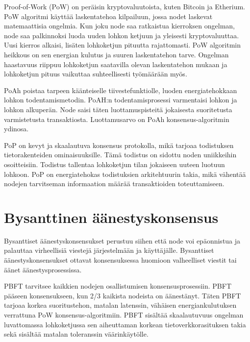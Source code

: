 \documentclass[utf8,bachelor]{gradu3}
\begin{document}
Proof-of-Work (PoW) on peräisin kryptovaluutoista, kuten Bitcoin ja Etherium. PoW algoritmi käyttää laskentatehoa kilpailuun, jossa nodet laskevat matemaattisia ongelmia. 
Kun joku node saa ratkaistua kierroksen ongelman, node saa palkinnoksi luoda uuden lohkon ketjuun ja yleisesti kryptovaluuttaa. Uusi kierros alkaisi, lisäten lohkoketjun pituutta rajattomasti. PoW algoritmin heikkous on sen energian kulutus ja suuren laskentatehon tarve. 
Ongelman haastavuus riippuu lohkoketjun saatavilla olevan laskentatehon mukaan ja lohkoketjun pituus vaikuttaa suhteellisesti työmäärään myös.

PoAh poistaa tarpeen käänteiselle tiivestefunktiolle, luoden energiatehokkaan lohkon todentamismetodin. PoAH:n todentamisprosessi varmentaisi lohkon ja lohkon alkuperän.
Node saisi täten luottamuspisteitä jokaisesta suoritetusta varmistetusta transaktiosta. Luottamusarvo on PoAh konsensus-algoritmin ydinosa.

PoP on kevyt ja skaalautuva konsensus protokolla, mikä tarjoaa todistuksen tietorakenteiden ominaisuuksille. Tämä todistus on sidottu noden uniikkeihin osoitteisiin. Todistus tallentaa lohkoketjun tilan jokaiseen uuteen luotuun lohkoon. PoP on energiatehokas todistuksien arkitehtuurin takia, mikä vähentää nodejen tarvitseman informaation määrää transaktioiden toteuttamiseen.

\section{Bysanttinen äänestyskonsensus}
Bysanttiset äänestyskonsensukset perustuu siihen että node voi epäonnistua ja palauttaa virheellisiä viestejä järjestelmään ja käyttäjälle. 
Bysanttiset äänestyskonsensukset ottavat konsensuksessa huomioon valheelliset viestit tai äänet äänestysprosessissa.

PBFT tarvitsee kaikkien nodejen osallistumisen konsensusprosessiin.
PBFT pääseen konsensukseen, kun 2/3 kaikista nodeista on äänestänyt.
Täten PBFT tarjoaa korkea suoritustehon, matalan latenssin, vähäisen energiankulutuksen verrattuna PoW konsensus-algoritmiin.
PBFT sisältää skaalautuvuus ongelman luvattomassa lohkoketjussa sen aiheuttaman korkean tietoverkkorasituksen takia sekä sisältää matalan toleranssin väärinkäytölle.
\end{document}
